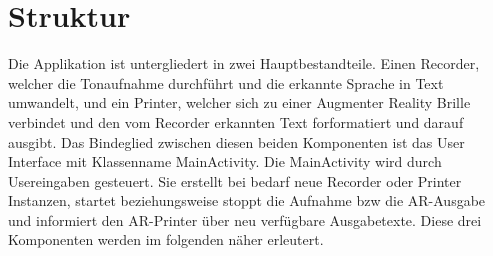 \chapter{Struktur}
Die Applikation ist untergliedert in zwei Hauptbestandteile. Einen Recorder, welcher die Tonaufnahme durchführt und die erkannte Sprache in Text umwandelt, und ein Printer, welcher sich zu einer Augmenter Reality Brille verbindet und den vom Recorder erkannten Text forformatiert und darauf ausgibt. Das Bindeglied zwischen diesen beiden Komponenten ist das User Interface mit Klassenname MainActivity. Die MainActivity wird durch Usereingaben gesteuert. Sie erstellt bei bedarf neue Recorder oder Printer Instanzen, startet beziehungsweise stoppt die Aufnahme bzw die AR-Ausgabe und informiert den AR-Printer über neu verfügbare Ausgabetexte. Diese drei Komponenten werden im folgenden näher erleutert.

